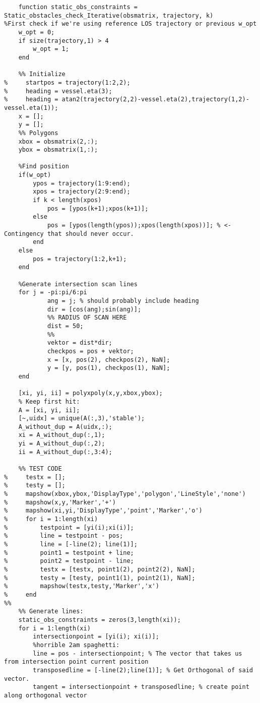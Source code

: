 \clearpage
\begin{lstlisting}
    function static_obs_constraints = Static_obstacles_check_Iterative(obsmatrix, trajectory, k)
%First check if we're using reference LOS trajectory or previous w_opt
    w_opt = 0;
    if size(trajectory,1) > 4
        w_opt = 1;
    end

    %% Initialize
%     startpos = trajectory(1:2,2);
%     heading = vessel.eta(3);
%     heading = atan2(trajectory(2,2)-vessel.eta(2),trajectory(1,2)-vessel.eta(1));
    x = [];
    y = [];
    %% Polygons
    xbox = obsmatrix(2,:);
    ybox = obsmatrix(1,:);

    %Find position
    if(w_opt)
        ypos = trajectory(1:9:end);
        xpos = trajectory(2:9:end);
        if k < length(xpos)
            pos = [ypos(k+1);xpos(k+1)];
        else
            pos = [ypos(length(ypos));xpos(length(xpos))]; % <- Contingency that should never occur.
        end
    else
        pos = trajectory(1:2,k+1);        
    end
    
    %Generate intersection scan lines
    for j = -pi:pi/6:pi
            ang = j; % should probably include heading
            dir = [cos(ang);sin(ang)];
            %% RADIUS OF SCAN HERE
            dist = 50;
            %%
            vektor = dist*dir;
            checkpos = pos + vektor;
            x = [x, pos(2), checkpos(2), NaN];
            y = [y, pos(1), checkpos(1), NaN];
    end

    [xi, yi, ii] = polyxpoly(x,y,xbox,ybox);
    % Keep first hit:
    A = [xi, yi, ii];
    [~,uidx] = unique(A(:,3),'stable');
    A_without_dup = A(uidx,:);
    xi = A_without_dup(:,1);
    yi = A_without_dup(:,2);
    ii = A_without_dup(:,3:4);
    
    %% TEST CODE
%     testx = [];
%     testy = [];
%     mapshow(xbox,ybox,'DisplayType','polygon','LineStyle','none')
%     mapshow(x,y,'Marker','+')
%     mapshow(xi,yi,'DisplayType','point','Marker','o')
%     for i = 1:length(xi)
%         testpoint = [yi(i);xi(i)];
%         line = testpoint - pos;
%         line = [-line(2); line(1)];
%         point1 = testpoint + line;
%         point2 = testpoint - line;
%         testx = [testx, point1(2), point2(2), NaN];
%         testy = [testy, point1(1), point2(1), NaN];
%         mapshow(testx,testy,'Marker','x')
%     end
%%
    %% Generate lines:
    static_obs_constraints = zeros(3,length(xi));
    for i = 1:length(xi)
        intersectionpoint = [yi(i); xi(i)];
        %horrible 2am spaghetti:
        line = pos - intersectionpoint; % The vector that takes us from intersection point current position
        transposedline = [-line(2);line(1)]; % Get Orthogonal of said vector.
        tangent = intersectionpoint + transposedline; % create point along orthogonal vector
        

\end{lstlisting}
